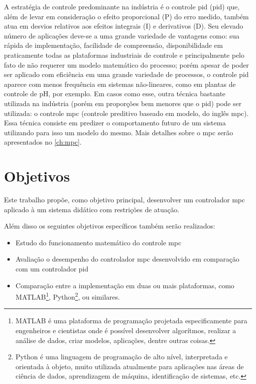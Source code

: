 A estratégia de controle predominante na indústria é o controle \acrshort{pid}
(\acrlong{pid}) que, além de levar em consideração o efeito proporcional (P) do erro
medido, também atua em desvios relativos aos efeitos integrais (I) e derivativos (D).
Seu elevado número de aplicações deve-se a uma grande variedade de vantagens como:
sua rápida de implementação, facilidade de compreensão, disponibilidade em praticamente
todas as plataformas industriais de controle e principalmente pelo fato de não requerer
um modelo matemático do processo; porém apesar de poder ser aplicado com eficiência em
uma grande variedade de processos, o controle \acrshort{pid} aparece com menos frequência
em sistemas não-lineares, como em plantas de controle de pH, por exemplo. Em casos como
esse, outra técnica bastante utilizada na indústria (porém em proporções bem menores
que o \acrshort{pid}) pode ser utilizada: o controle \acrshort{mpc} (controle preditivo
baseado em modelo, do inglês \acrlong{mpc}). Essa técnica consiste em predizer o
comportamento futuro de um sistema utilizando para isso um modelo do mesmo. Mais
detalhes sobre o \acrshort{mpc} serão apresentados no \cref{ch:mpc}.

\section{Objetivos}

Este trabalho propõe, como objetivo principal, desenvolver um controlador \acrshort{mpc}
aplicado à um sistema didático com restrições de atuação.

Além disso os seguintes objetivos específicos também serão realizados:
\begin{itemize}
    \item Estudo do funcionamento matemático do controle \acrshort{mpc}
    \item Avaliação o desempenho do controlador \acrshort{mpc} desenvolvido em
        comparação com um controlador \acrshort{pid}
    \item Comparação entre a implementação em duas ou mais plataformas,
        como MATLAB\textsuperscript{\tiny\textregistered}\footnote{
            MATLAB\textsuperscript{\tiny\textregistered} é uma plataforma
            de programação projetada especificamente para engenheiros e cientistas
            onde é possível desenvolver algorítmos, realizar a análise de dados,
            criar modelos, aplicações, dentre outras coisas.},
        Python\footnote{
            Python é uma linguagem de programação de alto nível,
            interpretada e orientada à objeto, muito utilizada atualmente para
            aplicações nas áreas de ciência de dados, aprendizagem de máquina,
            identificação de sistemas, etc.},
        ou similares.
\end{itemize}

